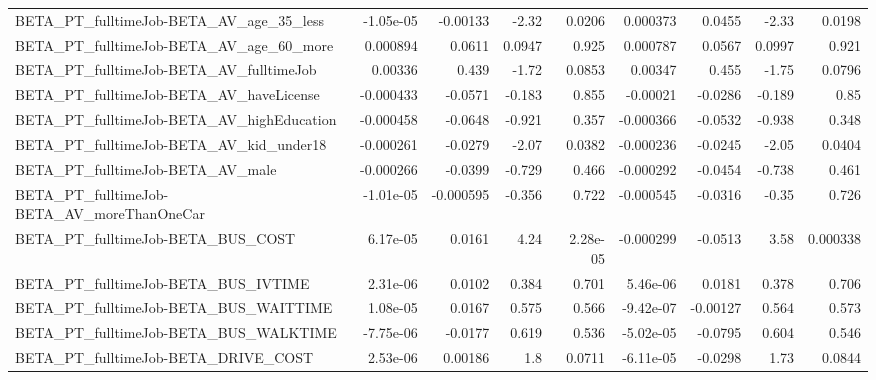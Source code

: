 \begin{tabular}{lrrrrrrrr}
BETA\_PT\_fulltimeJob-BETA\_AV\_age\_35\_less            &   -1.05e-05 &     -0.00133 &    -2.32 &   0.0206 &   0.000373 &      0.0455 &        -2.33 &        0.0198 \\
BETA\_PT\_fulltimeJob-BETA\_AV\_age\_60\_more            &    0.000894 &       0.0611 &   0.0947 &    0.925 &   0.000787 &      0.0567 &       0.0997 &         0.921 \\
BETA\_PT\_fulltimeJob-BETA\_AV\_fulltimeJob            &     0.00336 &        0.439 &    -1.72 &   0.0853 &    0.00347 &       0.455 &        -1.75 &        0.0796 \\
BETA\_PT\_fulltimeJob-BETA\_AV\_haveLicense            &   -0.000433 &      -0.0571 &   -0.183 &    0.855 &   -0.00021 &     -0.0286 &       -0.189 &          0.85 \\
BETA\_PT\_fulltimeJob-BETA\_AV\_highEducation          &   -0.000458 &      -0.0648 &   -0.921 &    0.357 &  -0.000366 &     -0.0532 &       -0.938 &         0.348 \\
BETA\_PT\_fulltimeJob-BETA\_AV\_kid\_under18            &   -0.000261 &      -0.0279 &    -2.07 &   0.0382 &  -0.000236 &     -0.0245 &        -2.05 &        0.0404 \\
BETA\_PT\_fulltimeJob-BETA\_AV\_male                   &   -0.000266 &      -0.0399 &   -0.729 &    0.466 &  -0.000292 &     -0.0454 &       -0.738 &         0.461 \\
BETA\_PT\_fulltimeJob-BETA\_AV\_moreThanOneCar         &   -1.01e-05 &    -0.000595 &   -0.356 &    0.722 &  -0.000545 &     -0.0316 &        -0.35 &         0.726 \\
BETA\_PT\_fulltimeJob-BETA\_BUS\_COST                  &    6.17e-05 &       0.0161 &     4.24 & 2.28e-05 &  -0.000299 &     -0.0513 &         3.58 &      0.000338 \\
BETA\_PT\_fulltimeJob-BETA\_BUS\_IVTIME                &    2.31e-06 &       0.0102 &    0.384 &    0.701 &   5.46e-06 &      0.0181 &        0.378 &         0.706 \\
BETA\_PT\_fulltimeJob-BETA\_BUS\_WAITTIME              &    1.08e-05 &       0.0167 &    0.575 &    0.566 &  -9.42e-07 &    -0.00127 &        0.564 &         0.573 \\
BETA\_PT\_fulltimeJob-BETA\_BUS\_WALKTIME              &   -7.75e-06 &      -0.0177 &    0.619 &    0.536 &  -5.02e-05 &     -0.0795 &        0.604 &         0.546 \\
BETA\_PT\_fulltimeJob-BETA\_DRIVE\_COST                &    2.53e-06 &      0.00186 &      1.8 &   0.0711 &  -6.11e-05 &     -0.0298 &         1.73 &        0.0844 \\

\end{tabular}
